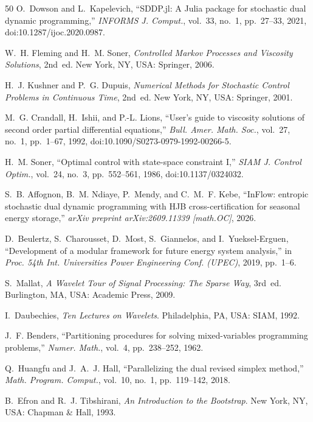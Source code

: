 \documentclass[11pt,a4paper]{article}
\begin{document}
\begin{thebibliography}{50}
 O.~Dowson and L.~Kapelevich, ``SDDP.jl: A Julia
package for stochastic dual dynamic programming,'' \emph{INFORMS J. Comput.},
vol.~33, no.~1, pp.~27--33, 2021, doi:10.1287/ijoc.2020.0987.

 W.~H. Fleming and H.~M. Soner, \emph{Controlled Markov
Processes and Viscosity Solutions}, 2nd~ed. New York, NY, USA: Springer, 2006.

 H.~J. Kushner and P.~G. Dupuis, \emph{Numerical Methods for
Stochastic Control Problems in Continuous Time}, 2nd~ed. New York, NY, USA:
Springer, 2001.

 M.~G. Crandall, H.~Ishii, and P.-L. Lions,
``User's guide to viscosity solutions of second order partial differential
equations,'' \emph{Bull. Amer. Math. Soc.}, vol.~27, no.~1, pp.~1--67, 1992,
doi:10.1090/S0273-0979-1992-00266-5.

 H.~M. Soner, ``Optimal control with state-space
constraint I,'' \emph{SIAM J. Control Optim.}, vol.~24, no.~3, pp.~552--561,
1986, doi:10.1137/0324032.

S.~B. Affognon, B.~M. Ndiaye, P.~Mendy, and C.~M.~F. Kebe,
``InFlow: entropic stochastic dual dynamic programming with HJB
cross-certification for seasonal energy storage,''
\emph{arXiv preprint arXiv:2609.11339 [math.OC]}, 2026.

 D.~Beulertz, S.~Charousset, D.~Most, S.~Giannelos, and
I.~Yueksel-Erguen, ``Development of a modular framework for future energy system
analysis,'' in \emph{Proc. 54th Int. Universities Power Engineering Conf.
(UPEC)}, 2019, pp.~1--6.

 S.~Mallat, \emph{A Wavelet Tour of Signal Processing: The
Sparse Way}, 3rd~ed. Burlington, MA, USA: Academic Press, 2009.

 I.~Daubechies, \emph{Ten Lectures on Wavelets}.
Philadelphia, PA, USA: SIAM, 1992.

 J.~F. Benders, ``Partitioning procedures for solving
mixed-variables programming problems,'' \emph{Numer. Math.}, vol.~4,
pp.~238--252, 1962.

 Q.~Huangfu and J.~A.~J. Hall, ``Parallelizing the dual
revised simplex method,'' \emph{Math. Program. Comput.}, vol.~10, no.~1,
pp.~119--142, 2018.

 B.~Efron and R.~J. Tibshirani, \emph{An Introduction to the
Bootstrap}. New York, NY, USA: Chapman \& Hall, 1993.


\end{thebibliography}
\end{document}
